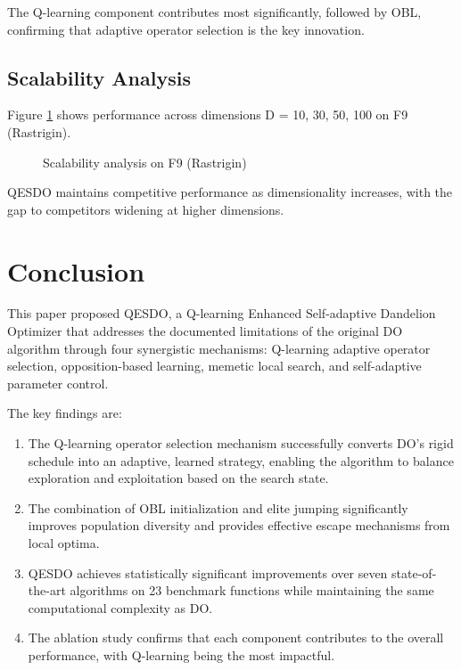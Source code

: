 \documentclass[preprint,12pt]{elsarticle}
\begin{document}
The Q-learning component contributes most significantly, followed by OBL, confirming that adaptive operator selection is the key innovation.

\subsection{Scalability Analysis}
\label{subsec:scalability}

Figure \ref{fig:scalability} shows performance across dimensions D = 10, 30, 50, 100 on F9 (Rastrigin).

\begin{figure}[htbp]
\centering
{}
\caption{Scalability analysis on F9 (Rastrigin)}
\label{fig:scalability}
\end{figure}

QESDO maintains competitive performance as dimensionality increases, with the gap to competitors widening at higher dimensions.

\section{Conclusion}
\label{sec:conclusion}

This paper proposed QESDO, a Q-learning Enhanced Self-adaptive Dandelion Optimizer that addresses the documented limitations of the original DO algorithm through four synergistic mechanisms: Q-learning adaptive operator selection, opposition-based learning, memetic local search, and self-adaptive parameter control.

The key findings are:
\begin{enumerate}
    \item The Q-learning operator selection mechanism successfully converts DO's rigid schedule into an adaptive, learned strategy, enabling the algorithm to balance exploration and exploitation based on the search state.
    \item The combination of OBL initialization and elite jumping significantly improves population diversity and provides effective escape mechanisms from local optima.
    \item QESDO achieves statistically significant improvements over seven state-of-the-art algorithms on 23 benchmark functions while maintaining the same computational complexity as DO.
    \item The ablation study confirms that each component contributes to the overall performance, with Q-learning being the most impactful.
\end{enumerate}
\end{document}
